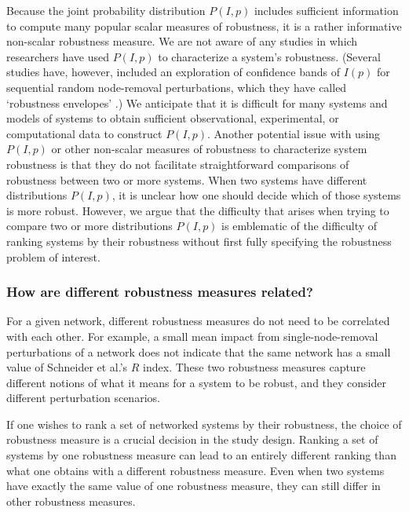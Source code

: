 \documentclass{comnet-mod}
\begin{document}
Because the joint probability distribution $P(I,p)$ includes sufficient information to compute many popular scalar measures of robustness, it is a rather informative non-scalar robustness measure. We are not aware of any studies in which researchers have used $P(I,p)$ to characterize a system's robustness. (Several studies have, however, included an exploration of confidence bands of $I(p)$ for sequential random node-removal perturbations, which they have called `robustness envelopes' \cite{Trajanovski2013, Zanin2018, Sun2021}.) We anticipate that it is difficult for many systems and models of systems to obtain sufficient observational, experimental, or computational data to construct $P(I,p)$. Another potential issue with using $P(I,p)$ or other non-scalar measures of robustness to characterize system robustness is that they do not facilitate straightforward comparisons of robustness between two or more systems. When two systems have different distributions $P(I,p)$, it is unclear how one should decide which of those systems is more robust. However, we argue that the difficulty that arises when trying to compare two or more distributions $P(I,p)$ is emblematic of the difficulty of ranking systems by their robustness without first fully specifying the robustness problem of interest. 


\subsubsection{How are different robustness measures related?}\label{sec:robustness_correlations}

For a given network, different robustness measures do not need to be correlated with each other. For example, a small mean impact from single-node-removal perturbations of a network does not indicate that the same network has a small value of Schneider et al.'s $R$ index. These two robustness measures capture different notions of what it means for a system to be robust, and they consider different perturbation scenarios.

If one wishes to rank a set of networked systems by their robustness, the choice of robustness measure is a crucial decision in the study design. Ranking a set of systems by one robustness measure can lead to an entirely different ranking than what one obtains with a different robustness measure. Even when two systems have exactly the same value of one robustness measure, they can still differ in other robustness measures. 
\end{document}
